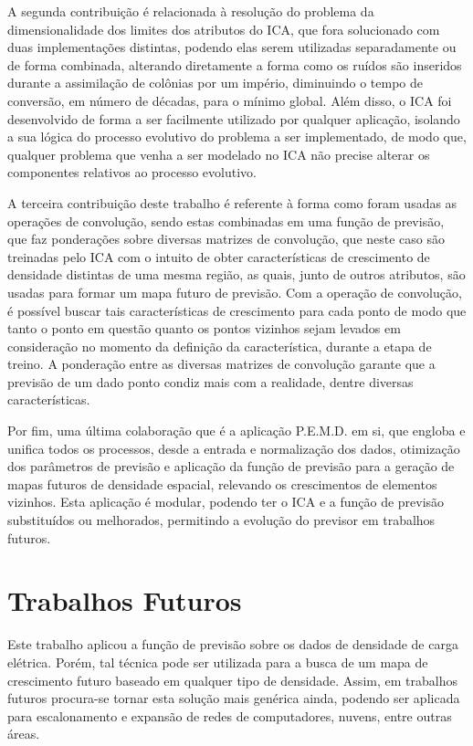 A segunda contribuição é relacionada à resolução do problema da dimensionalidade dos limites dos atributos do ICA, que fora solucionado com duas implementações distintas, podendo elas serem utilizadas separadamente ou de forma combinada, alterando diretamente a forma como os ruídos são inseridos durante a assimilação de colônias por um império, diminuindo o tempo de conversão, em número de décadas, para o mínimo global. Além disso, o ICA foi desenvolvido de forma a ser facilmente utilizado por qualquer aplicação, isolando a sua lógica do processo evolutivo do problema a ser implementado, de modo que, qualquer problema que venha a ser modelado no ICA não precise alterar os componentes relativos ao processo evolutivo. 

A terceira contribuição deste trabalho é referente à forma como foram usadas as operações de convolução, sendo estas combinadas em uma função de previsão, que faz ponderações sobre diversas matrizes de convolução, que neste caso são treinadas pelo ICA com o intuito de obter características de crescimento de densidade distintas de uma mesma região, as quais, junto de outros atributos, são usadas para formar um mapa futuro de previsão. Com a operação de convolução, é possível buscar tais características de crescimento para cada ponto de modo que tanto o ponto em questão quanto os pontos vizinhos sejam levados em consideração no momento da definição da característica, durante a etapa de treino. A ponderação entre as diversas matrizes de convolução garante que a previsão de um dado ponto condiz mais com a realidade, dentre diversas características.

Por fim, uma última colaboração que é a aplicação P.E.M.D. em si, que engloba e unifica todos os processos, desde a entrada e normalização dos dados, otimização dos parâmetros de previsão e aplicação da função de previsão para a geração de mapas futuros de densidade espacial, relevando os crescimentos de elementos vizinhos. Esta aplicação é modular, podendo ter o ICA e a função de previsão substituídos ou melhorados, permitindo a evolução do previsor em trabalhos futuros.

\section{Trabalhos Futuros}
\label{trabalhos_futuros}

Este trabalho aplicou a função de previsão sobre os dados de densidade de carga elétrica. Porém, tal técnica pode ser utilizada para a busca de um mapa de crescimento futuro baseado em qualquer tipo de densidade. Assim, em trabalhos futuros procura-se tornar esta solução mais genérica ainda, podendo ser aplicada para escalonamento e expansão de redes de computadores, nuvens, entre outras áreas.

